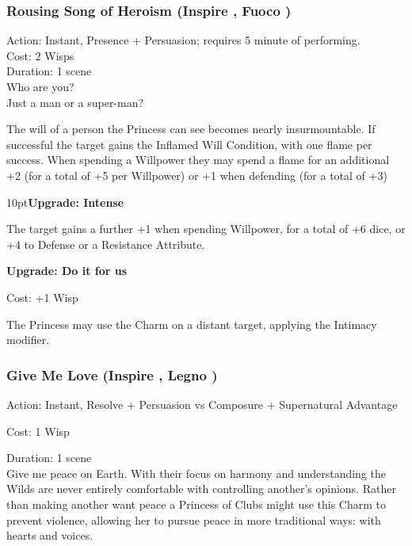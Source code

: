 \subsubsection*{Rousing Song of Heroism (Inspire \textbullet\textbullet\textbullet, Fuoco \textbullet\textbullet)}

\noindent Action: Instant, Presence + Persuasion; requires 5 minute of performing. \\

\noindent Cost: 2 Wisps\\

\noindent Duration: 1 scene \\

\noindent Who are you? \\

\noindent Just a man or a super-man?

The will of a person the Princess can see becomes nearly insurmountable. If successful the target gains the Inflamed Will Condition, with one flame per success. When spending a Willpower they may spend a flame for an additional +2 (for a total of +5 per Willpower) or +1 when defending (for a total of +3)

\begin{myindentpar}{10pt}\textbf{Upgrade: Intense}

The target gains a further +1 when spending Willpower, for a total of +6 dice, or +4 to Defense or a Resistance Attribute.

\textbf{Upgrade: Do it for us}

\noindent Cost: +1 Wisp

The Princess may use the Charm on a distant target, applying the Intimacy modifier.\end{myindentpar}

\subsubsection*{Give Me Love (Inspire \textbullet\textbullet\textbullet, Legno \textbullet\textbullet)}

\noindent Action: Instant, Resolve + Persuasion vs Composure + Supernatural Advantage

\noindent Cost: 1 Wisp

\noindent Duration: 1 scene \\

\noindent Give me peace on Earth. With their focus on harmony and understanding the Wilds are never entirely comfortable with controlling another's opinions. Rather than making another want peace a Princess of Clubs might use this Charm to prevent violence, allowing her to pursue peace in more traditional ways: with hearts and voices.

